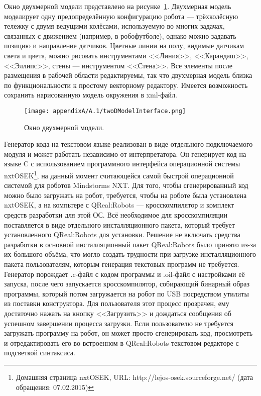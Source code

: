 Окно двухмерной модели представлено на рисунке~\ref{image:twoDModelInterface}. Двухмерная 
модель моделирует одну предопределённую конфигурацию робота --- трёхколёсную тележку 
с двумя ведущими колёсами, используемую во многих задачах, связанных с движением (например, 
в робофутболе), однако можно задавать позицию и направление датчиков. Цветные линии 
на полу, видимые датчикам света и цвета, можно рисовать инструментами <<Линия>>, <<Карандаш>>, 
<<Эллипс>>, стены --- инструментом <<Стена>>. Все элементы после размещения в рабочей 
области редактируемы, так что двухмерная модель близка по функциональности к простому 
векторному редактору. Имеется возможность сохранить нарисованную модель окружения в xml-файл.

\begin{figure} [ht]
	\begin{center}
		\texttt{[image: appendixA/A.1/twoDModelInterface.png]}
		\caption{Окно двухмерной модели.}
		\label{image:twoDModelInterface}
	\end{center}
\end{figure}

Генератор кода на текстовом языке реализован в виде отдельного подключаемого модуля 
и может работать независимо от интерпретатора. Он генерирует код на языке C с использованием 
программного интерфейса операционной системы nxtOSEK\footnote{Домашняя страница nxtOSEK, URL: http://lejos-osek.sourceforge.net/ (дата обращения: 07.02.2015)},
на данный момент считающейся самой быстрой операционной системой для роботов Mindstorms NXT. 
Для того, чтобы сгенерированный код можно было загружать на робот, требуется, чтобы 
на роботе была установлена nxtOSEK, а на компьтере с QReal:Robots --- кросскомпилятор 
и комплект средств разработки для этой ОС. Всё необходимое для кросскомпиляции поставляется 
в виде отдельного инсталляционного пакета, который требует установленного QReal:Robots 
для установки. Решение не включать средства разработки в основной инсталляционный 
пакет QReal:Robots было принято из-за их большого объёма, что могло создать трудности 
при загрузке инсталляционного пакета пользователям, которым генерация текстовых программ 
не требуется. Генератор порождает .c-файл с кодом программы и .oil-файл с настройками 
её запуска, после чего запускается кросскомпилятор, собирающий бинарный образ программы, 
который потом загружается на робот по USB посредством утилиты из поставки конструктора. 
Для пользователя этот процесс прозрачен, ему достаточно нажать на кнопку <<Загрузить>> 
и дождаться сообщения об успешном завершении процесса загрузки. Если пользователю 
не требуется загружать программу на робот, он может просто сгенерировать код, просмотреть 
и отредактировать его во встроенном в QReal:Robots текстовом редакторе с подсветкой синтаксиса.

